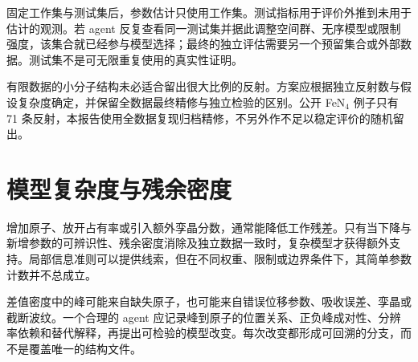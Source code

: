 固定工作集与测试集后，参数估计只使用工作集。测试指标用于评价外推到未用于估计的观测。若 agent 反复查看同一测试集并据此调整空间群、无序模型或限制强度，该集合就已经参与模型选择；最终的独立评估需要另一个预留集合或外部数据。测试集不是可无限重复使用的真实性证明。

有限数据的小分子结构未必适合留出很大比例的反射。方案应根据独立反射数与假设复杂度确定，并保留全数据最终精修与独立检验的区别。公开 FeN$_4$ 例子只有 71 条反射，本报告使用全数据复现归档精修，不另外作不足以稳定评价的随机留出。

\section{模型复杂度与残余密度}
增加原子、放开占有率或引入额外孪晶分数，通常能降低工作残差。只有当下降与新增参数的可辨识性、残余密度消除及独立数据一致时，复杂模型才获得额外支持。局部信息准则可以提供线索，但在不同权重、限制或边界条件下，其简单参数计数并不总成立。

差值密度中的峰可能来自缺失原子，也可能来自错误位移参数、吸收误差、孪晶或截断波纹。一个合理的 agent 应记录峰到原子的位置关系、正负峰成对性、分辨率依赖和替代解释，再提出可检验的模型改变。每次改变都形成可回溯的分支，而不是覆盖唯一的结构文件。
